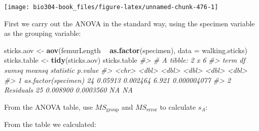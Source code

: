 \documentclass[]{book}
\newenvironment{Shaded}{\begin{snugshade}}{\end{snugshade}}
\newcommand{\CommentTok}[1]{\textcolor[rgb]{0.56,0.35,0.01}{\textit{#1}}}
\newcommand{\DataTypeTok}[1]{\textcolor[rgb]{0.13,0.29,0.53}{#1}}
\newcommand{\DecValTok}[1]{\textcolor[rgb]{0.00,0.00,0.81}{#1}}
\newcommand{\KeywordTok}[1]{\textcolor[rgb]{0.13,0.29,0.53}{\textbf{#1}}}
\newcommand{\NormalTok}[1]{#1}
\newcommand{\OperatorTok}[1]{\textcolor[rgb]{0.81,0.36,0.00}{\textbf{#1}}}
\newcommand{\StringTok}[1]{\textcolor[rgb]{0.31,0.60,0.02}{#1}}
\theoremstyle{definition}
\theoremstyle{definition}
\theoremstyle{definition}
\theoremstyle{remark}
\begin{document}
\begin{center}\texttt{[image: bio304-book\_files/figure-latex/unnamed-chunk-476-1]} \end{center}

First we carry out the ANOVA in the standard way, using the specimen
variable as the grouping variable:

\begin{Shaded}
\begin{Highlighting}[]
\NormalTok{sticks.aov <-}\StringTok{ }\KeywordTok{aov}\NormalTok{(femurLength }\OperatorTok{~}\StringTok{ }\KeywordTok{as.factor}\NormalTok{(specimen), }
                  \DataTypeTok{data =}\NormalTok{ walking.sticks)}
\NormalTok{sticks.table <-}\StringTok{ }\KeywordTok{tidy}\NormalTok{(sticks.aov)}
\NormalTok{sticks.table}
\CommentTok{#> # A tibble: 2 x 6}
\CommentTok{#>   term                   df    sumsq    meansq statistic      p.value}
\CommentTok{#>   <chr>               <dbl>    <dbl>     <dbl>     <dbl>        <dbl>}
\CommentTok{#> 1 as.factor(specimen)    24 0.05913  0.002464      6.921  0.000004077}
\CommentTok{#> 2 Residuals              25 0.008900 0.0003560    NA     NA}
\end{Highlighting}
\end{Shaded}

From the ANOVA table, use \(MS_\text{group}\) and \(MS_\text{error}\) to
calculate \(s_A\):

\begin{Shaded}
\end{Shaded}

From the table we calculated:
\end{document}
